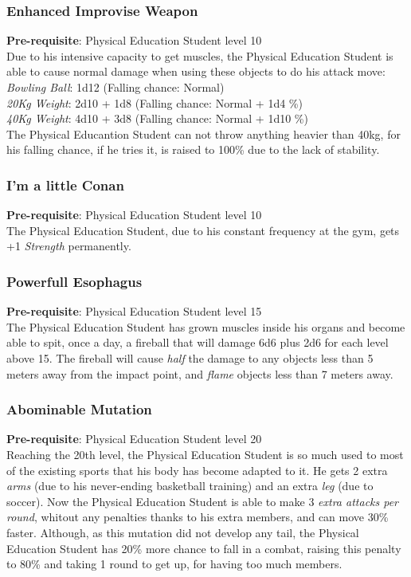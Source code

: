 \documentclass[ letterpaper,12pt]{article}
\begin{document}
\subsubsection{Enhanced Improvise Weapon}
{\bf Pre-requisite}: Physical Education Student level 10\\
 Due to his intensive capacity to get muscles, the Physical Education Student is able to cause normal damage when using these objects to do his attack move:
{\it Bowling Ball}: 1d12 (Falling chance: Normal)\\
{\it 20Kg Weight}: 2d10 + 1d8 (Falling chance: Normal + 1d4 \%)\\
{\it 40Kg Weight}: 4d10 + 3d8 (Falling chance: Normal + 1d10 \%)\\
 The Physical Educantion Student can not throw anything heavier than 40kg, for his falling chance, if he tries it, is raised to 100\% due to the lack of stability.

\subsubsection{I'm a little Conan}
 {\bf Pre-requisite}: Physical Education Student level 10\\
 The Physical Education Student, due to his constant frequency at the gym, gets +1 {\it Strength} permanently.

\subsubsection{Powerfull Esophagus}
 {\bf Pre-requisite}: Physical Education Student level 15\\
 The Physical Education Student has grown muscles inside his organs and become able to spit, once a day, a fireball that will damage 6d6 plus 2d6 for each level above 15. The fireball will cause {\it half} the damage to any objects less than 5 meters away from the impact point, and {\it flame} objects less than 7 meters away.

\subsubsection{Abominable Mutation}
 {\bf Pre-requisite}: Physical Education Student level 20\\
 Reaching the 20th level, the Physical Education Student is so much used to most of the existing sports that his body has become adapted to it. He gets 2 extra {\it arms} (due to his never-ending basketball training) and an extra {\it leg} (due to soccer). Now the Physical Education Student is able to make 3 {\it extra attacks per round}, whitout any penalties thanks to his extra members, and can move 30\% faster. Although, as this mutation did not develop any tail, the Physical Education Student has 20\% more chance to fall in a combat, raising this penalty to 80\% and taking 1 round to get up, for having too much members.
\end{document}
